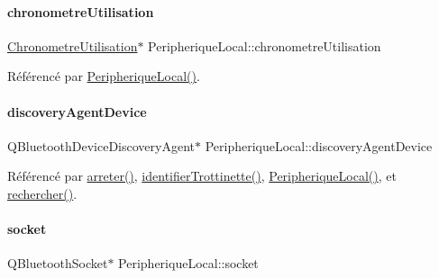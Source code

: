 \paragraph{\texorpdfstring{chronometre\+Utilisation}{chronometreUtilisation}}
{\footnotesize\ttfamily \hyperlink{class_chronometre_utilisation}{Chronometre\+Utilisation}$\ast$ Peripherique\+Local\+::chronometre\+Utilisation\hspace{0.3cm}{\ttfamily [private]}}



Référencé par \hyperlink{class_peripherique_local_a99a652b8659a3692f164cf1a0382e4bf}{Peripherique\+Local()}.

\mbox{\label{class_peripherique_local_a9e398b7dd89a20b1bee67b8c3467da69}} 
\paragraph{\texorpdfstring{discovery\+Agent\+Device}{discoveryAgentDevice}}
{\footnotesize\ttfamily Q\+Bluetooth\+Device\+Discovery\+Agent$\ast$ Peripherique\+Local\+::discovery\+Agent\+Device\hspace{0.3cm}{\ttfamily [private]}}



Référencé par \hyperlink{class_peripherique_local_afbbb6d37b616cc4579486c3b1ce700b2}{arreter()}, \hyperlink{class_peripherique_local_aab3b5a9b584b0191b9f690add1cfa6ed}{identifier\+Trottinette()}, \hyperlink{class_peripherique_local_a99a652b8659a3692f164cf1a0382e4bf}{Peripherique\+Local()}, et \hyperlink{class_peripherique_local_aa3b12b1c122605cf00b8ab48ed4284c1}{rechercher()}.

\mbox{\label{class_peripherique_local_a0058bf8367b4b8f907838b83a9150c07}} 
\paragraph{\texorpdfstring{socket}{socket}}
{\footnotesize\ttfamily Q\+Bluetooth\+Socket$\ast$ Peripherique\+Local\+::socket\hspace{0.3cm}{\ttfamily [private]}}




